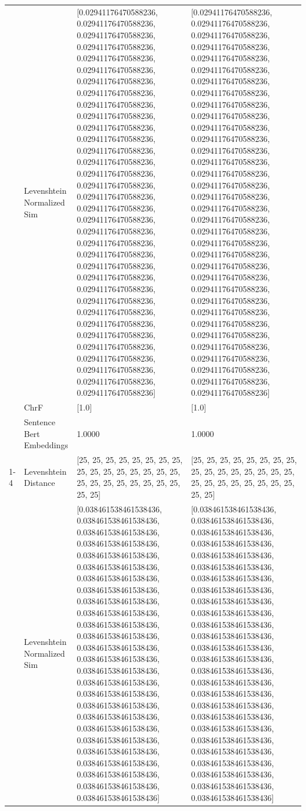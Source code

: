 \begin{tabular}{llll}
 & Levenshtein Normalized Sim & [0.02941176470588236, 0.02941176470588236, 0.02941176470588236, 0.02941176470588236, 0.02941176470588236, 0.02941176470588236, 0.02941176470588236, 0.02941176470588236, 0.02941176470588236, 0.02941176470588236, 0.02941176470588236, 0.02941176470588236, 0.02941176470588236, 0.02941176470588236, 0.02941176470588236, 0.02941176470588236, 0.02941176470588236, 0.02941176470588236, 0.02941176470588236, 0.02941176470588236, 0.02941176470588236, 0.02941176470588236, 0.02941176470588236, 0.02941176470588236, 0.02941176470588236, 0.02941176470588236, 0.02941176470588236, 0.02941176470588236, 0.02941176470588236, 0.02941176470588236, 0.02941176470588236, 0.02941176470588236, 0.02941176470588236, 0.02941176470588236] & [0.02941176470588236, 0.02941176470588236, 0.02941176470588236, 0.02941176470588236, 0.02941176470588236, 0.02941176470588236, 0.02941176470588236, 0.02941176470588236, 0.02941176470588236, 0.02941176470588236, 0.02941176470588236, 0.02941176470588236, 0.02941176470588236, 0.02941176470588236, 0.02941176470588236, 0.02941176470588236, 0.02941176470588236, 0.02941176470588236, 0.02941176470588236, 0.02941176470588236, 0.02941176470588236, 0.02941176470588236, 0.02941176470588236, 0.02941176470588236, 0.02941176470588236, 0.02941176470588236, 0.02941176470588236, 0.02941176470588236, 0.02941176470588236, 0.02941176470588236, 0.02941176470588236, 0.02941176470588236, 0.02941176470588236, 0.02941176470588236] \\
 & ChrF & [1.0] & [1.0] \\
 & Sentence Bert Embeddings & 1.0000 & 1.0000 \\
\cline{1-4}
\multirow[t]{4}{*}{Amanyira nigo are omoyo k'era ogose.} & Levenshtein Distance & [25, 25, 25, 25, 25, 25, 25, 25, 25, 25, 25, 25, 25, 25, 25, 25, 25, 25, 25, 25, 25, 25, 25, 25, 25, 25] & [25, 25, 25, 25, 25, 25, 25, 25, 25, 25, 25, 25, 25, 25, 25, 25, 25, 25, 25, 25, 25, 25, 25, 25, 25, 25] \\
 & Levenshtein Normalized Sim & [0.038461538461538436, 0.038461538461538436, 0.038461538461538436, 0.038461538461538436, 0.038461538461538436, 0.038461538461538436, 0.038461538461538436, 0.038461538461538436, 0.038461538461538436, 0.038461538461538436, 0.038461538461538436, 0.038461538461538436, 0.038461538461538436, 0.038461538461538436, 0.038461538461538436, 0.038461538461538436, 0.038461538461538436, 0.038461538461538436, 0.038461538461538436, 0.038461538461538436, 0.038461538461538436, 0.038461538461538436, 0.038461538461538436, 0.038461538461538436, 0.038461538461538436, 0.038461538461538436] & [0.038461538461538436, 0.038461538461538436, 0.038461538461538436, 0.038461538461538436, 0.038461538461538436, 0.038461538461538436, 0.038461538461538436, 0.038461538461538436, 0.038461538461538436, 0.038461538461538436, 0.038461538461538436, 0.038461538461538436, 0.038461538461538436, 0.038461538461538436, 0.038461538461538436, 0.038461538461538436, 0.038461538461538436, 0.038461538461538436, 0.038461538461538436, 0.038461538461538436, 0.038461538461538436, 0.038461538461538436, 0.038461538461538436, 0.038461538461538436, 0.038461538461538436, 0.038461538461538436] \\

\end{tabular}
